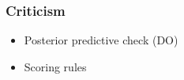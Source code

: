 \subsubsection{Criticism}

\begin{itemize}
  \item Posterior predictive check (DO)
  \item Scoring rules
\end{itemize}
